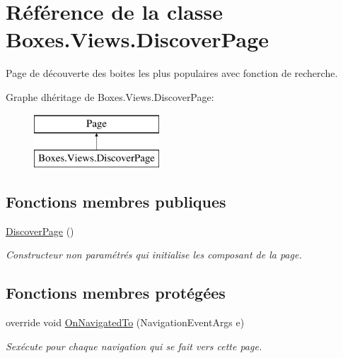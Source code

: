 \hypertarget{class_boxes_1_1_views_1_1_discover_page}{}\section{Référence de la classe Boxes.\+Views.\+Discover\+Page}
\label{class_boxes_1_1_views_1_1_discover_page}


Page de découverte des boites les plus populaires avec fonction de recherche.  


Graphe d\textquotesingle{}héritage de Boxes.\+Views.\+Discover\+Page\+:\begin{figure}[H]
\begin{center}
\leavevmode
\includegraphics[height=2.000000cm]{class_boxes_1_1_views_1_1_discover_page}
\end{center}
\end{figure}
\subsection*{Fonctions membres publiques}
\begin{DoxyCompactItemize}
\item 
\hyperlink{class_boxes_1_1_views_1_1_discover_page_aebc5e2b68f1a2453fc944c8294357cda}{Discover\+Page} ()
\begin{DoxyCompactList}\small\item\em Constructeur non paramétrés qui initialise les composant de la page. \end{DoxyCompactList}\end{DoxyCompactItemize}
\subsection*{Fonctions membres protégées}
\begin{DoxyCompactItemize}
\item 
override void \hyperlink{class_boxes_1_1_views_1_1_discover_page_a0db5fe023f31ce56393aa5486e4a13a3}{On\+Navigated\+To} (Navigation\+Event\+Args e)
\begin{DoxyCompactList}\small\item\em S\textquotesingle{}exécute pour chaque navigation qui se fait vers cette page. \end{DoxyCompactList}\end{DoxyCompactItemize}

